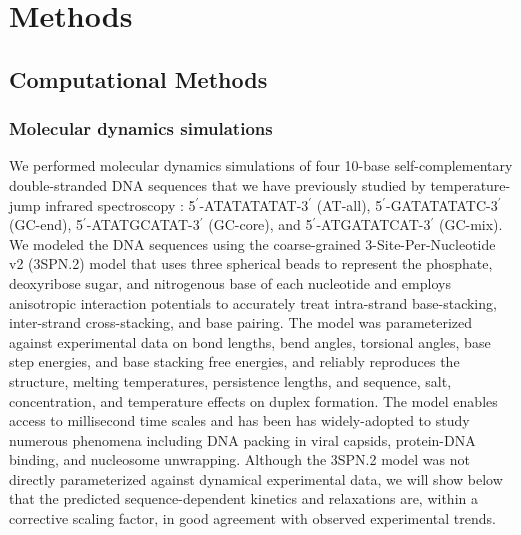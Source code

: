 \documentclass[journal=jpcbfk,manuscript=article]{achemso}
\begin{document}
\section{\label{sec:methods}Methods}

\subsection{Computational Methods}

\subsubsection{Molecular dynamics simulations}

We performed molecular dynamics simulations of four 10-base self-complementary double-stranded DNA sequences that we have previously studied by temperature-jump infrared spectroscopy \citep{Sanstead2016}: 5$^\prime$-ATATATATAT-3$^\prime$ (AT-all), 5$^\prime$-GATATATATC-3$^\prime$ (GC-end), 5$^\prime$-ATATGCATAT-3$^\prime$ (GC-core), and  5$^\prime$-ATGATATCAT-3$^\prime$ (GC-mix). We modeled the DNA sequences using the coarse-grained 3-Site-Per-Nucleotide v2 (3SPN.2) model that uses three spherical beads to represent the phosphate, deoxyribose sugar, and nitrogenous base of each nucleotide and employs anisotropic interaction potentials to accurately treat intra-strand base-stacking, inter-strand cross-stacking, and base pairing. \citep{Hinckley2013AnHybridization} The model was parameterized against experimental data on bond lengths, bend angles, torsional angles, base step energies, and base stacking free energies, and reliably reproduces the structure, melting temperatures, persistence lengths, and sequence, salt, concentration, and temperature effects on duplex formation. \citep{Hinckley2013AnHybridization} The model enables access to millisecond time scales and has been has widely-adopted to study numerous phenomena including DNA packing in viral capsids, protein-DNA binding, and nucleosome unwrapping.\citep{Cordoba2017AIons, Lu2020OpenAWSEMSimulations, Lequieu2016Tension-dependentUnwrapping} Although the 3SPN.2 model was not directly parameterized against dynamical experimental data, we will show below that the predicted sequence-dependent kinetics and relaxations are, within a corrective scaling factor, in good agreement with observed experimental trends.
\end{document}
